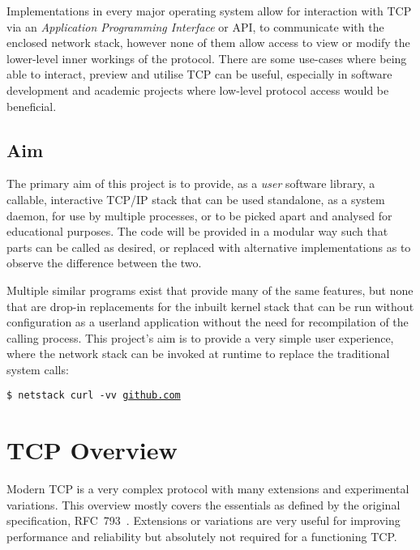 \documentclass[11pt,a4paper,british]{bhamarticle}
\begin{document}
\begin{multicols}{2}
Implementations in every major operating system allow for interaction with TCP via an \textit{Application Programming Interface} or API, to communicate with the enclosed network stack, however none of them allow access to view or modify the lower-level inner workings of the protocol. There are some use-cases where being able to interact, preview and utilise TCP can be useful, especially in software development and academic projects where low-level protocol access would be beneficial.

\subsection{Aim}
The primary aim of this project is to provide, as a \textit{user} software library, a callable, interactive TCP/IP stack that can be used standalone, as a system daemon, for use by multiple processes, or to be picked apart and analysed for educational purposes. The code will be provided in a modular way such that parts can be called as desired, or replaced with alternative implementations as to observe the difference between the two.

Multiple similar programs exist that provide many of the same features, but none that are drop-in replacements for the inbuilt kernel stack that can be run without configuration as a userland application without the need for recompilation of the calling process. This project's aim is to provide a very simple user experience, where the network stack can be invoked at runtime to replace the traditional system calls:

\begin{center}
    \texttt{\$ netstack curl -vv \url{github.com}}
\end{center}

\section{TCP Overview}
Modern TCP is a very complex protocol with many extensions and experimental variations. This overview mostly covers the essentials as defined by the original specification, RFC~793~\cite{rfc793}. Extensions or variations are very useful for improving performance and reliability but absolutely not required for a functioning TCP. %


\end{multicols}
\end{document}
